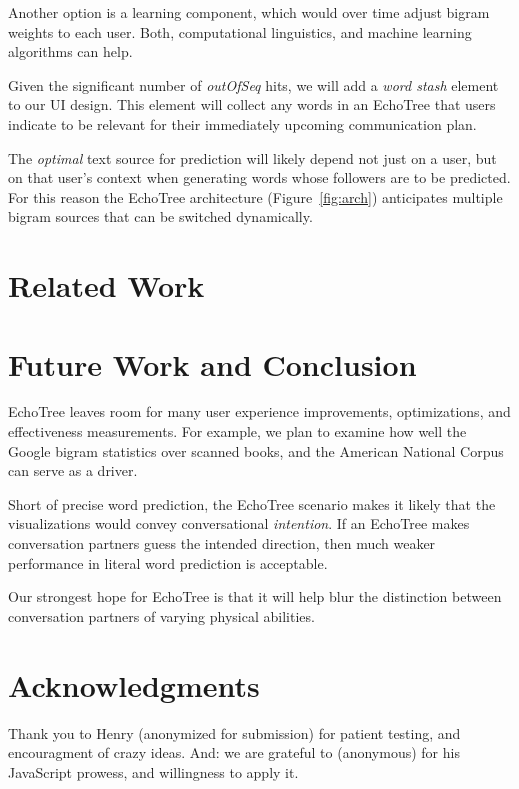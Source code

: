 \documentclass{sigchi}
\begin{document}
Another option is a learning component, which would over time adjust
bigram weights to each user. Both, computational linguistics, and
machine learning algorithms can help.

Given the significant number of {\em outOfSeq} hits, we will add
a {\em word stash} element to our UI design. This element will collect
any words in an EchoTree that users indicate to be relevant for their
immediately upcoming communication plan.

The {\em optimal} text source for prediction will likely depend not just on
a user, but on that user's context when generating words whose
followers are to be predicted. For this reason the EchoTree
architecture (Figure~\ref{fig:arch}) anticipates multiple bigram
sources that can be switched dynamically.

\section{Related Work}

\section{Future Work and Conclusion}
EchoTree leaves room for many user experience improvements,
optimizations, and effectiveness measurements. For example, we plan to
examine how well the Google bigram statistics over scanned books, and
the American National Corpus \cite{anc} can serve as a driver.

Short of precise word prediction, the EchoTree scenario makes it
likely that the visualizations would convey conversational {\em
  intention}. If an EchoTree makes conversation partners guess the
intended direction, then much weaker performance in literal word
prediction is acceptable.

Our strongest hope for EchoTree is that it will help blur the
distinction between conversation partners of varying physical
abilities. 

\section{Acknowledgments}
Thank you to Henry (anonymized for submission) for patient testing,
and encouragment of crazy ideas. And: we are grateful to (anonymous)
for his JavaScript prowess, and willingness to apply it.


%
%
%
%
%
\balance


\scriptsize{}
\end{document}
